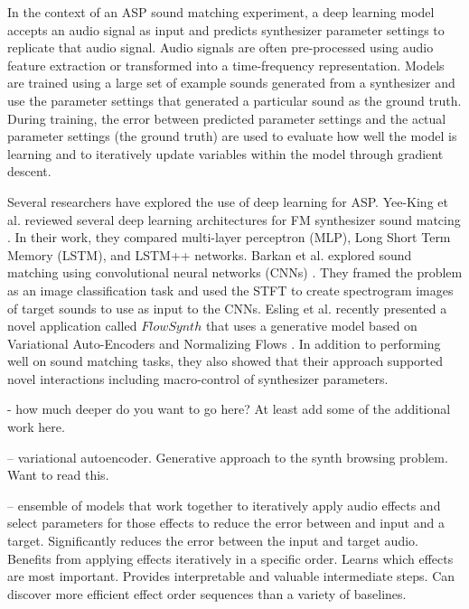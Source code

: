 In the context of an ASP sound matching experiment, a deep learning model accepts an audio signal as input and predicts synthesizer parameter settings to replicate that audio signal. Audio signals are often pre-processed using audio feature extraction or transformed into a time-frequency representation. Models are trained using a large set of example sounds generated from a synthesizer and use the parameter settings that generated a particular sound as the ground truth. During training, the error between predicted parameter settings and the actual parameter settings (the ground truth) are used to evaluate how well the model is learning and to iteratively update variables within the model through gradient descent. 

Several researchers have explored the use of deep learning for ASP. Yee-King et al. reviewed several deep learning architectures for FM synthesizer sound matcing \cite{yee2018automatic}. In their work, they compared multi-layer perceptron (MLP), Long Short Term Memory (LSTM), and LSTM++ networks. Barkan et al. explored sound matching using convolutional neural networks (CNNs) \cite{barkan2019deep, barkan2019inversynth}. They framed the problem as an image classification task and used the STFT to create spectrogram images of target sounds to use as input to the CNNs. Esling et al. recently presented a novel application called $FlowSynth$ that uses a generative model based on Variational Auto-Encoders and Normalizing Flows \cite{esling2020flow}. In addition to performing well on sound matching tasks, they also showed that their approach supported novel interactions including macro-control of synthesizer parameters.

- how much deeper do you want to go here? At least add some of the additional work here.

\cite{le2021improving} -- variational autoencoder. Generative approach to the synth browsing problem. Want to read this.

\cite{mitcheltree2021serumrnn} -- ensemble of models that work together to iteratively apply audio effects and select parameters for those effects to reduce the error between and input and a target. Significantly reduces the error between the input and target audio. Benefits from applying effects iteratively in a specific order. Learns which effects are most important. Provides interpretable and valuable intermediate steps. Can discover more efficient effect order sequences than a variety of baselines.

